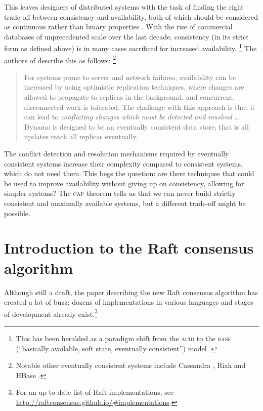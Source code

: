 \documentclass[11pt,chapterprefix=true,toc=bibliography,numbers=noendperiod,
               footnotes=multiple,twoside]{scrreprt}
\begin{document}
This leaves designers of distributed systems with the task of finding the right trade-off between consistency and availability, both of which should be considered as continuous rather than binary properties \autocite{cap12}. With the rise of commercial databases of unprecedented scale over the last decade, consistency (in its strict form as defined above) is in many cases sacrificed for increased availability.%
\footnote{This has been heralded as a paradigm shift from the \textsc{acid} to the \textsc{base} (\enquote{basically available, soft state, eventually consistent}) model \parencite{base}.} %
The authors of  describe this as follows:%
\footnote{Notable other eventually consistent systems include Cassandra , Riak  and HBase .}

\begin{quote}
    For systems prone to server and network failures, availability can be increased by using optimistic replication techniques, where changes are allowed to propagate to replicas in the background, and concurrent, disconnected work is tolerated. The challenge with this approach is that it can lead to \emph{conflicting changes which must be detected and resolved} \dots{} Dynamo is designed to be an eventually consistent data store; that is all updates reach all replicas eventually.
\end{quote}

The conflict detection and resolution mechanisms required by eventually consistent systems increase their complexity compared to consistent systems, which do not need them. This begs the question: are there techniques that could be used to improve availability without giving up on consistency, allowing for simpler systems? The \textsc{cap} theorem tells us that we can never build strictly consistent and maximally available systems, but a different trade-off might be possible.

\section{Introduction to the Raft consensus algorithm\label{ssc:raft-consensus-algorithm}}

Although still a draft, the paper describing the new Raft consensus algorithm \autocite{raft} has created a lot of buzz; dozens of implementations in various languages and stages of development already exist.\footnote{For an up-to-date list of Raft implementations, see \url{http://raftconsensus.github.io/\#implementations}.}
\end{document}
